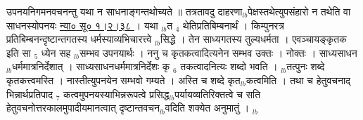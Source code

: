 \documentclass[article,12pt,a4paper]{memoir}%
\newcounter{parCount}
\begin{document}
	  
	  \pstart \leavevmode%
	\hphantom{.}उपनयनिगमनवचनन्तु यथा न साधनाङ्गन्तथोच्यते ॥ तत्रतावदु दाहरणा{\tiny $_{lb}$}पेक्षस्तथेत्युपसंहारो न तथेति वा साधनस्योपनयः \href{http://sarit.indology.info/?cref=ns\%C5\%AB.1.2.38}{न्या० सू०  १।२।३८ } । यथा {\tiny $_{lb}$}त {\tiny $_{4}$} थेतिप्रतिबिम्बनार्थं । किम्पुनरत्र प्रतिबिम्बनन्दृष्टान्तगतस्य धर्मस्याव्यभिचारत्त्वे {\tiny $_{lb}$}सिद्धे । तेन साध्यगतस्य तुल्यधर्मता । एवञ्चायङ्कृतक इति सा {\tiny $_{5}$} ध्येन सह {\tiny $_{lb}$}सम्भव उपनयार्थः । ननु च कृतकत्वादित्यनेन सम्भव उक्तः । नोक्तः । साध्यसाधन{\tiny $_{lb}$}धर्ममात्रनिर्देशात् । साध्यसाधनधर्ममात्रनिर्देशः कृ {\tiny $_{6}$} तकत्वादनित्यः शब्दो भवति । {\tiny $_{lb}$}तत्पुनः शब्दे कृतकत्त्वमस्ति । नास्तीत्युपनयेन सम्भवो गम्यते । अस्ति च शब्दे कृत{\tiny $_{lb}$}कत्वमिति । तथा च हेतुवचनाद् भिन्नार्थप्रतिपाद {\tiny $_{7}$} कत्वमुपनयस्याभिन्नरूपत्वे प्रसिद्ध{\tiny $_{lb}$}पर्यायव्यतिरिक्तत्वे च सति हेतुवचनोत्तरकालमुपादीयमानत्वात् दृष्टान्तवचन{\tiny $_{lb}$}वदिति शक्येत अनुमातुं ।
	{}
	\pend%
      {\tiny $_{lb}$}
\end{document}

